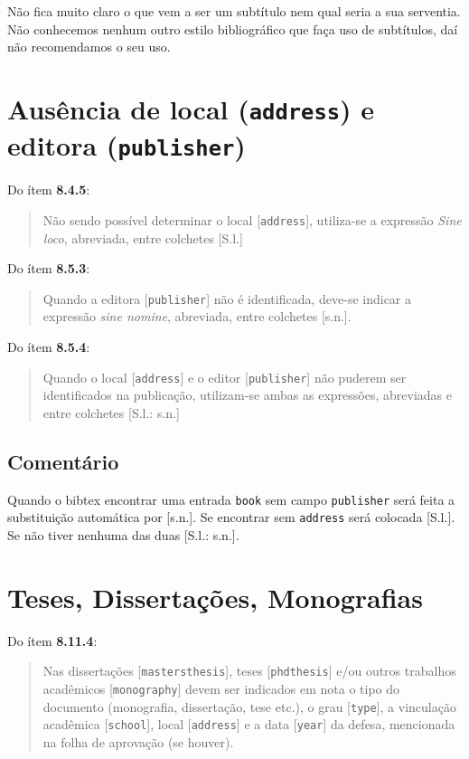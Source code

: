 \documentclass[espacosimples]{abnt}
\begin{document}
Não fica muito claro o que vem a ser um subtítulo nem qual seria a sua
serventia. Não conhecemos nenhum outro estilo bibliográfico que faça
uso de subtítulos, daí não recomendamos o seu uso.

\section{Ausência de local ({\tt address}) e editora ({\tt publisher})}

Do ítem {\bf 8.4.5}\cite{NBR6023:2000}:
\begin{quote}
Não sendo possível determinar o local [{\tt address}], utiliza-se a expressão \emph{Sine loco},
abreviada, entre colchetes [S.l.]
\end{quote}
Do ítem {\bf 8.5.3}\cite{NBR6023:2000}:
\begin{quote}
Quando a editora [{\tt publisher}] não é identificada, deve-se indicar a expressão
\emph{sine nomine}, abreviada, entre colchetes [s.n.].
\end{quote}
Do ítem {\bf 8.5.4}\cite{NBR6023:2000}:
\begin{quote}
Quando o local [{\tt address}] e o editor [{\tt publisher}] não puderem ser
identificados na publicação, utilizam-se ambas as expressões, abreviadas e
entre colchetes [S.l.: s.n.]
\end{quote}

\subsection{Comentário}
Quando o bibtex encontrar uma entrada {\tt book} sem campo {\tt publisher}
será feita a substituição automática por [s.n.].
\cite{8.5.3}
Se encontrar sem {\tt address} será colocada [S.l.]. \cite{8.4.5-1,8.4.5-2}
Se não tiver nenhuma das duas [S.l.: s.n.]. \cite{8.5.4}

\section{Teses, Dissertações, Monografias}
\label{sec-teses}

Do ítem {\bf 8.11.4}\cite{NBR6023:2000}:
\begin{quote}
Nas dissertações [{\tt mastersthesis}], teses [{\tt phdthesis}]
e/ou outros trabalhos acadêmicos [{\tt monography}] devem ser indicados
em nota o tipo do documento (monografia, dissertação, tese etc.), o grau [{\tt type}],
a vinculação acadêmica [{\tt school}], local [{\tt address}]
e a data [{\tt year}] da defesa, mencionada na folha de
aprovação (se houver). \cite{8.11.4-1,8.11.4-2,8.11.4-1b,8.11.4-1c}
\end{quote}
\end{document}
